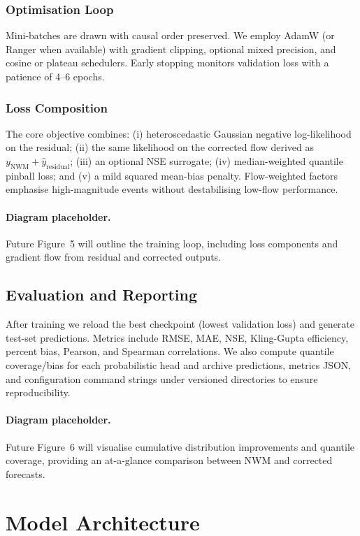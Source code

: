 \documentclass[draft]{agujournal2019}
\begin{document}
\subsubsection{Optimisation Loop}
Mini-batches are drawn with causal order preserved. We employ AdamW (or Ranger when available) with gradient clipping, optional mixed precision, and cosine or plateau schedulers. Early stopping monitors validation loss with a patience of 4--6 epochs.

\subsubsection{Loss Composition}
The core objective combines: (i) heteroscedastic Gaussian negative log-likelihood on the residual; (ii) the same likelihood on the corrected flow derived as \(y_{\text{NWM}} + \hat{y}_{\text{residual}}\); (iii) an optional NSE surrogate; (iv) median-weighted quantile pinball loss; and (v) a mild squared mean-bias penalty. Flow-weighted factors emphasise high-magnitude events without destabilising low-flow performance.

\paragraph{Diagram placeholder.} Future Figure~5 will outline the training loop, including loss components and gradient flow from residual and corrected outputs.

\subsection{Evaluation and Reporting}
After training we reload the best checkpoint (lowest validation loss) and generate test-set predictions. Metrics include RMSE, MAE, NSE, Kling-Gupta efficiency, percent bias, Pearson, and Spearman correlations. We also compute quantile coverage/bias for each probabilistic head and archive predictions, metrics JSON, and configuration command strings under versioned directories to ensure reproducibility.

\paragraph{Diagram placeholder.} Future Figure~6 will visualise cumulative distribution improvements and quantile coverage, providing an at-a-glance comparison between NWM and corrected forecasts.

\section{Model Architecture}
\end{document}
